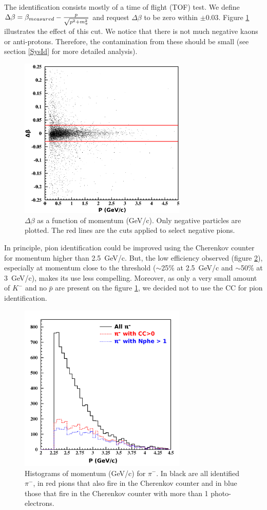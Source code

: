 The identification consists mostly of a time of flight (TOF) test. We define 
$\Delta \beta = \beta_{measured} - {p \over \sqrt{p^2 + m_\pi^2}}$ and request 
$\Delta \beta$ to be zero within $\pm 0.03$. Figure \ref{PionTOF} illustrates 
the effect of this cut. We notice that there is not much negative kaons or 
anti-protons. Therefore, the contamination from these should be small (see 
section \ref{SysId} for more detailed analysis).

\begin{figure}[tbp]
\centering
\includegraphics[width=8cm] {chap5-fig/fig05.png} 
\caption {$\Delta \beta$ as a 
function of momentum (GeV/c). Only negative particles are plotted. The red 
lines are the cuts applied to select negative pions.}
\label{PionTOF}
\end{figure}

In principle, pion identification could be improved using the Cherenkov counter 
for momentum higher than 2.5~GeV/c. But, the low efficiency observed (figure 
\ref{PionCC}), especially at momentum close to the threshold ($\sim$25\% at 
2.5~GeV/c and $\sim$50\% at 3~GeV/c), makes its use less compelling. 
Moreover, as only a very small amount of $K^-$ and no $\bar p$ are present on 
the figure \ref{PionTOF}, we decided not to use the CC for pion identification.

\begin{figure}[tbp]
\centering
\includegraphics[width=8cm] {chap5-fig/fig06.png} 
\caption {Histograms of momentum (GeV/c) for $\pi^-$. In black are all 
identified $\pi^-$, in red pions that also fire in the Cherenkov counter and 
in blue those that fire in the Cherenkov counter with more than 
1 photo-electrons.}
\label{PionCC}
\end{figure}

